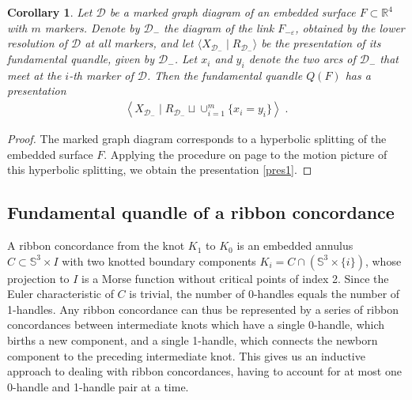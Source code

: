 \documentclass[a4paper,12pt]{amsart}
\numberwithin{equation}{section}
\theoremstyle{plain}
\newtheorem{corollary}[theorem]{Corollary}
\theoremstyle{definition}
\newcommand{\s}{\mathbb{S}}
\newcommand{\RR}{\mathbb{R}}
\renewcommand{\epsilon}{\varepsilon}
\begin{document}
\begin{corollary} 
	Let $\mathcal{D}$ be a marked graph diagram of an embedded surface $F\subset \RR^{4}$ with $m$ markers. 
	Denote by $\mathcal{D}_{-}$ the diagram of the link $F_{-\epsilon }$, obtained by the lower resolution of $\mathcal{D}$ at all markers, and let $\langle X_{\mathcal{D}_{-}}\mid R_{\mathcal{D}_{-}}\rangle $ be the presentation of its fundamental quandle, given by $\mathcal{D}_{-}$. 
	Let $x_{i}$ and $y_i$ denote the two arcs of $\mathcal{D}_{-}$ that meet at the $i$-th marker of $\mathcal{D}$. 
	Then the fundamental quandle $Q(F)$ has a presentation
	\begin{align}
		\label{pres1}
		\left \langle X_{\mathcal{D_{-}}}\mid R_{\mathcal{D}_{-}}\sqcup \cup _{i=1}^{m}\{x_{i}=y_{i}\}\right \rangle \;.
	\end{align}
\end{corollary}
\begin{proof} 
	The marked graph diagram corresponds to a hyperbolic splitting of the embedded surface $F$. 
	Applying the procedure on page \pageref{procedure} to the motion picture of this hyperbolic splitting, we obtain the presentation \eqref{pres1}.
\end{proof}






























\subsection{Fundamental quandle of a ribbon concordance}
\label{subsec2-2}


A ribbon concordance from the knot $K_1$ to $K_0$ is an embedded annulus $C\subset \s ^{3}\times I$ with two knotted boundary components 
$K_{i}=C\cap \left (\s ^{3}\times \{i\}\right )$, whose projection to $I$ is a Morse function without critical points of index 2.
Since the Euler characteristic of $C$ is trivial, the number of 0-handles equals the number of 1-handles. Any ribbon concordance can thus
be represented by a series of ribbon concordances between intermediate knots which have a single 0-handle,
which births a new component, and a single 1-handle, which connects the newborn component to the preceding intermediate knot.
This gives us an inductive approach to dealing with ribbon concordances, having to account for at most one 0-handle and 1-handle pair at a time.
\end{document}
